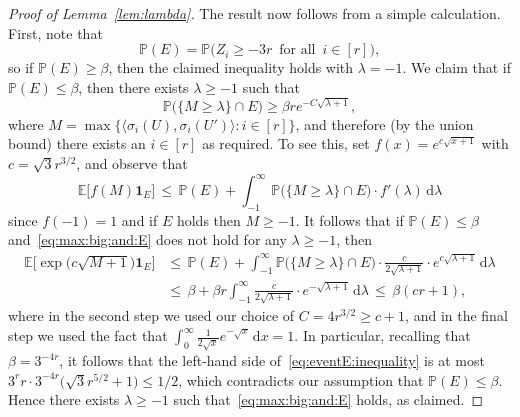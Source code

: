 \documentclass[12pt,reqno]{amsart}
\theoremstyle{definition}
\theoremstyle{remark}
\newcommand\R{\mathbb{R}}
\def\Pr{\mathbb{P}}
\newcommand\Ex{\mathbb{E}}
\renewcommand{\le}{\leqslant}
\renewcommand{\ge}{\geqslant}
\renewcommand{\to}{\rightarrow}
\def\R{\mathbb{R}}
\begin{document}
\begin{proof}[Proof of Lemma~\ref{lem:lambda}]
The result now follows from a simple calculation. First, note that 
$$\Pr(E) = \Pr\Big( Z_i \ge - 3r \, \text{ for all } \, i \in [r] \Big),$$
so if $\Pr(E) \ge \beta$, then the claimed inequality holds with $\lambda = -1$. We claim that if $\Pr(E) \le \beta$, then there exists $\lambda \ge -1$ such that
\begin{equation}\label{eq:max:big:and:E}
 \Pr\Big( \big\{ M \ge \lambda \big\} \cap E \Big) \ge \beta r e^{-C\sqrt{\lambda + 1}},
\end{equation}
where $M = \max \big\{ \big\langle \sigma_i(U),\sigma_i(U') \big\rangle : i \in [r] \big\}$, 
and therefore (by the union bound) there exists an $i \in [r]$ as required. To see this, set $f(x) = e^{c \sqrt{x + 1}}$ with $c = \sqrt{3}r^{3/2}$, and observe that %
$$\Ex\big[ f(M) \mathbf{1}_E \big] \, \le \, \Pr(E) + \int_{-1}^\infty \Pr\Big( \big\{ M \ge \lambda \big\} \cap E \Big) \cdot f'(\lambda) \,\mathrm{d}\lambda$$
since $f(-1) = 1$ and if $E$ holds then $M \ge -1$. It follows that if $\Pr(E) \le \beta$ and~\eqref{eq:max:big:and:E} does not hold for any $\lambda \ge -1$, then 
\begin{align*}
\Ex\Big[ \exp\big( c \sqrt{M + 1} \big) \mathbf{1}_E \Big]
& \le \, \Pr(E) + \int_{-1}^\infty \Pr\Big( \big\{ M \ge \lambda \big\} \cap E \Big) \cdot \frac{c}{2\sqrt{\lambda + 1}} \cdot e^{c \sqrt{\lambda + 1}} \,\mathrm{d}\lambda\\
& \le \, \beta + \beta r \int_{-1}^\infty \frac{c}{2\sqrt{\lambda + 1}} \cdot e^{- \sqrt{\lambda + 1}} \,\mathrm{d}\lambda \, \le \, \beta (cr + 1),
\end{align*}
where %
in the second step we used our choice of $C = 4r^{3/2} \ge c + 1$, %
and in the final step we used the fact that $\int_0^\infty \frac{1}{2\sqrt{x}} e^{-\sqrt{x}} \, \mathrm{d}x = 1$. In particular, %
recalling that %
$\beta = 3^{-4r}$, it follows that the left-hand side of~\eqref{eq:eventE:inequality} is at most $3^r r \cdot 3^{-4r} \big( \sqrt{3}r^{5/2} + 1 \big) \le 1/2$, which contradicts our assumption that $\Pr(E) \le \beta$. Hence there exists $\lambda \ge -1$ such that~\eqref{eq:max:big:and:E} holds, as claimed.
\end{proof}
\end{document}
